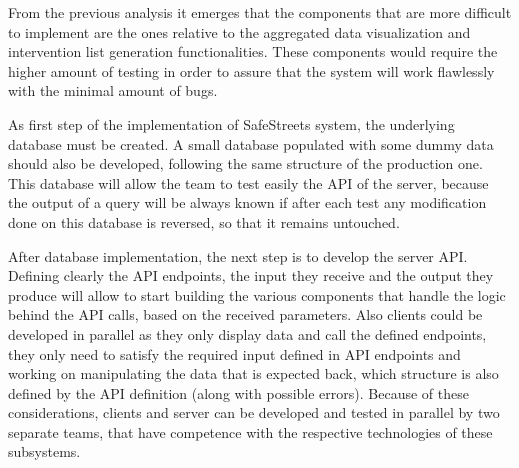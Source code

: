 From the previous analysis it emerges that the components that are more difficult to implement are the ones relative to the aggregated data visualization and intervention list generation functionalities. These components would require the higher amount of testing in order to assure that the system will work flawlessly with the minimal amount of bugs.

As first step of the implementation of SafeStreets system, the underlying database must be created. A small database populated with some dummy data should also be developed, following the same structure of the production one. This database will allow the team to test easily the API of the server, because the output of a query will be always known if after each test any modification done on this database is reversed, so that it remains untouched.

After database implementation, the next step is to develop the server API. Defining clearly the API endpoints, the input they receive and the output they produce will allow to start building the various components that handle the logic behind the API calls, based on the received parameters. Also clients could be developed in parallel as they only display data and call the defined endpoints, they only need to satisfy the required input defined in API endpoints and working on manipulating the data that is expected back, which structure is also defined by the API definition (along with possible errors). Because of these considerations, clients and server can be developed and tested in parallel by two separate teams, that have competence with the respective technologies of these subsystems.

